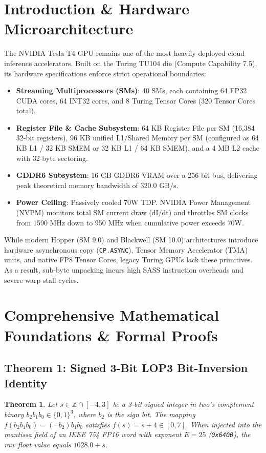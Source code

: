 \documentclass[10pt,twocolumn,letterpaper]{article}
\newtheorem{theorem}{Theorem}
\begin{document}
\section{Introduction \& Hardware Microarchitecture}
The NVIDIA Tesla T4 GPU remains one of the most heavily deployed cloud inference accelerators. Built on the Turing TU104 die (Compute Capability 7.5), its hardware specifications enforce strict operational boundaries:
\begin{itemize}
  \item \textbf{Streaming Multiprocessors (SMs)}: 40 SMs, each containing 64 FP32 CUDA cores, 64 INT32 cores, and 8 Turing Tensor Cores ($320$ Tensor Cores total).
  \item \textbf{Register File & Cache Subsystem}: 64 KB Register File per SM (16,384 32-bit registers), 96 KB unified L1/Shared Memory per SM (configured as 64 KB L1 / 32 KB SMEM or 32 KB L1 / 64 KB SMEM), and a 4 MB L2 cache with 32-byte sectoring.
  \item \textbf{GDDR6 Subsystem}: 16 GB GDDR6 VRAM over a 256-bit bus, delivering peak theoretical memory bandwidth of $320.0 \text{ GB/s}$.
  \item \textbf{Power Ceiling}: Passively cooled 70W TDP. NVIDIA Power Management (NVPM) monitors total SM current draw ($\text{dI/dt}$) and throttles SM clocks from 1590 MHz down to 950 MHz when cumulative power exceeds 70W.
\end{itemize}

While modern Hopper (SM 9.0) and Blackwell (SM 10.0) architectures introduce hardware asynchronous copy (\texttt{CP.ASYNC}), Tensor Memory Accelerator (TMA) units, and native FP8 Tensor Cores, legacy Turing GPUs lack these primitives. As a result, sub-byte unpacking incurs high SASS instruction overheads and severe warp stall cycles.

\section{Comprehensive Mathematical Foundations \& Formal Proofs}

\subsection{Theorem 1: Signed 3-Bit LOP3 Bit-Inversion Identity}
\begin{theorem}
Let $s \in \mathbb{Z} \cap [-4, 3]$ be a 3-bit signed integer in two's complement binary $b_2 b_1 b_0 \in \{0, 1\}^3$, where $b_2$ is the sign bit. The mapping $f(b_2 b_1 b_0) = (\neg b_2) b_1 b_0$ satisfies $f(s) = s + 4 \in [0, 7]$. When injected into the mantissa field of an IEEE 754 FP16 word with exponent $E = 25$ (\texttt{0x6400}), the raw float value equals $1028.0 + s$.
\end{theorem}
\end{document}
